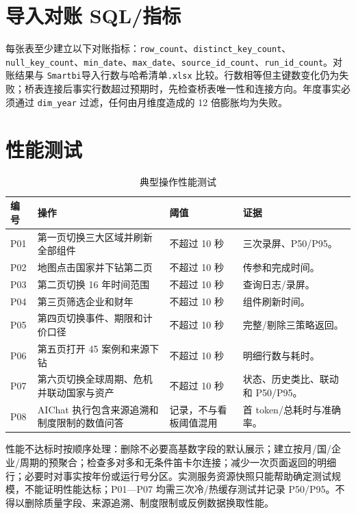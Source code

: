 \documentclass[UTF8,fontset=windows,12pt,openany]{ctexbook}
\newcommand{\Field}[1]{{\small\nolinkurl{#1}}}
\newcommand{\File}[1]{{\small\nolinkurl{#1}}}
\begin{document}
\section{导入对账 SQL/指标}

每张表至少建立以下对账指标：\Field{row_count}、\Field{distinct_key_count}、\Field{null_key_count}、\Field{min_date}、\Field{max_date}、\Field{source_id_count}、\Field{run_id_count}。对账结果与 \File{Smartbi}\textsf{导入行数与哈希清单}\File{.xlsx} 比较。行数相等但主键数变化仍为失败；桥表连接后事实行数超过预期时，先检查桥表唯一性和连接方向。年度事实必须通过 \Field{dim_year} 过滤，任何由月维度造成的 12 倍膨胀均为失败。

\section{性能测试}

\begin{longtable}{p{2.0cm}p{4.7cm}p{3.1cm}p{3.8cm}}
\caption{典型操作性能测试}\label{tab:performance}\\
\toprule
\textbf{编号} & \textbf{操作} & \textbf{阈值} & \textbf{证据}\\
\midrule
P01 & 第一页切换三大区域并刷新全部组件 & 不超过 10 秒 & 三次录屏、P50/P95。\\
P02 & 地图点击国家并下钻第二页 & 不超过 10 秒 & 传参和完成时间。\\
P03 & 第二页切换 16 年时间范围 & 不超过 10 秒 & 查询日志/录屏。\\
P04 & 第三页筛选企业和财年 & 不超过 10 秒 & 组件刷新时间。\\
P05 & 第四页切换事件、期限和计价口径 & 不超过 10 秒 & 完整/剔除三策略返回。\\
P06 & 第五页打开 45 案例和来源下钻 & 不超过 10 秒 & 明细行数与耗时。\\
P07 & 第六页切换全球周期、危机并联动国家与资产 & 不超过 10 秒 & 状态、历史类比、联动和 P50/P95。\\
P08 & AIChat 执行包含来源追溯和制度限制的数值问答 & 记录，不与看板阈值混用 & 首 token/总耗时与准确率。\\
\bottomrule
\end{longtable}

性能不达标时按顺序处理：删除不必要高基数字段的默认展示；建立按月/国/企业/周期的预聚合；检查多对多和无条件笛卡尔连接；减少一次页面返回的明细行；必要时对事实按年份或运行号分区。实测服务资源快照只能帮助确定测试规模，不能证明性能达标；P01—P07 均需三次冷/热缓存测试并记录 P50/P95。不得以删除质量字段、来源追溯、制度限制或反例数据换取性能。
\end{document}
